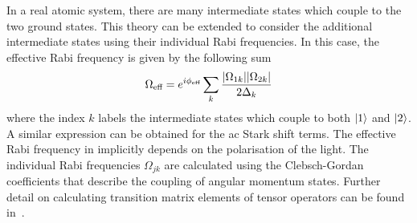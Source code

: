 In a real atomic system, there are many intermediate states which
couple to the two ground states. This theory can be extended to
consider the additional intermediate states using their individual
Rabi frequencies. In this case, the effective Rabi frequency is given
by the following sum
\begin{equation}
  \label{eq:rabi_raman_sum}
  \Omega_\textnormal{eff} = e^{i \phi_\textnormal{eff}}  \sum_k
\frac{|\Omega_{1k}| |\Omega_{2k}|}{2\Delta_k}
\end{equation}
where the index $k$ labels the intermediate states which couple to
both $\ket{1}$ and $\ket{2}$. A similar expression can be obtained for
the ac Stark shift terms. The effective Rabi frequency in  implicitly
depends on the polarisation of the light. The individual Rabi
frequencies $\Omega_{jk}$ are calculated using the Clebsch-Gordan
coefficients that describe the coupling of angular momentum states.
Further detail on calculating transition matrix elements of tensor
operators can be found in~\cite{Brink1968}. 
